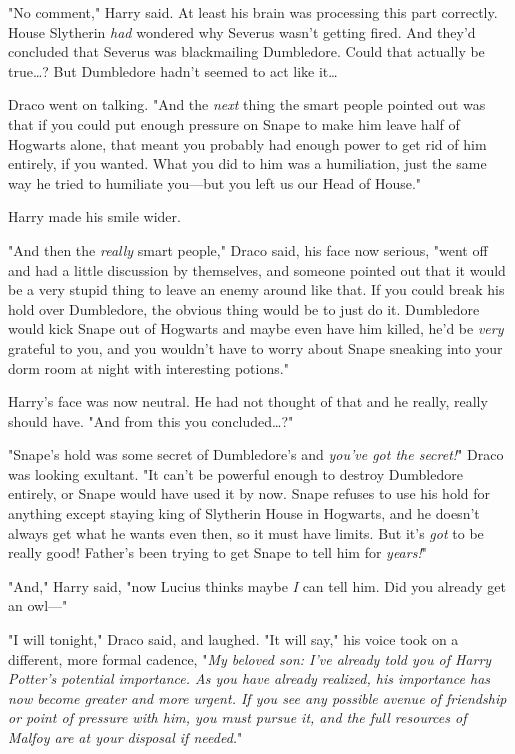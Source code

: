 "No comment," Harry said. At least his brain was processing this part
correctly. House Slytherin \emph{had} wondered why Severus wasn't getting
fired. And they'd concluded that Severus was blackmailing Dumbledore. Could
that actually be true{\ldots}? But Dumbledore hadn't seemed to act like
it{\ldots}

Draco went on talking. "And the \emph{next} thing the smart people pointed out
was that if you could put enough pressure on Snape to make him leave half of
Hogwarts alone, that meant you probably had enough power to get rid of him
entirely, if you wanted. What you did to him was a humiliation, just the same
way he tried to humiliate you---but you left us our Head of House."

Harry made his smile wider.

"And then the \emph{really} smart people," Draco said, his face now serious,
"went off and had a little discussion by themselves, and someone pointed out
that it would be a very stupid thing to leave an enemy around like that. If you
could break his hold over Dumbledore, the obvious thing would be to just do it.
Dumbledore would kick Snape out of Hogwarts and maybe even have him killed,
he'd be \emph{very} grateful to you, and you wouldn't have to worry about Snape
sneaking into your dorm room at night with interesting potions."

Harry's face was now neutral. He had not thought of that and he really, really
should have. "And from this you concluded{\ldots}?"

"Snape's hold was some secret of Dumbledore's and \emph{you've got the
secret!}" Draco was looking exultant. "It can't be powerful enough to destroy
Dumbledore entirely, or Snape would have used it by now. Snape refuses to use
his hold for anything except staying king of Slytherin House in Hogwarts, and
he doesn't always get what he wants even then, so it must have limits. But it's
\emph{got} to be really good! Father's been trying to get Snape to tell him for
\emph{years!}"

"And," Harry said, "now Lucius thinks maybe \emph{I} can tell him. Did you
already get an owl---"

"I will tonight," Draco said, and laughed. "It will say," his voice took on a
different, more formal cadence, "\emph{My beloved son: I've already told you of
Harry Potter's potential importance. As you have already realized, his
importance has now become greater and more urgent. If you see any possible
avenue of friendship or point of pressure with him, you must pursue it, and the
full resources of Malfoy are at your disposal if needed.}"

